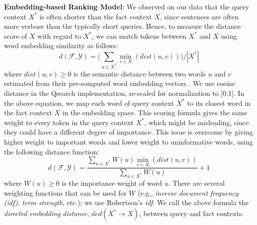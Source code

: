 \noindent \textbf{Embedding-based Ranking Model}: 
We observed on our data that the query context $X^*$ is often shorter than the fact context $X$, since sentences are often more verbose than the typically short queries. Hence, to measure the distance score of $X$ with regard to $X^*$, we can match tokens between $X^*$ and $X$ using word embedding similarity as follows:
\[d(\mathcal{F}, \mathcal{Y}) = {\bigg(\sum\limits_{u \in X^*} \min\limits_{v \in X}(dist(u,v))\bigg)}/{|X^*|}\]
where $dist(u,v) \geq 0$ is the semantic distance between two words $u$ and $v$ estimated from their pre-computed word embedding vectors \cite{DBLP:conf/emnlp/PenningtonSM14}. 
We use cosine distance in the Qsearch implementation, re-scaled for normalization to [0,1]. 
In the above equation, 
we map each word of query context $X^*$ to its closest word in the fact context $X$ in the embedding space. This scoring formula gives the same weight to every token in the query context $X^*$, which might be misleading, since they could have a different degree of importance.
This issue is overcome by giving higher weight to important words and lower weight
to uninformative words, using
the following distance function:
\[d(\mathcal{F}, \mathcal{Y}) = \frac{\sum\limits_{u \in X^*} W(u)\min\limits_{v \in X}(dist(u,v))}{\sum\limits_{u \in X^*}W(u)} + 1\]
where $W(u) \geq 0$ is the importance weight of word $u$. 
There are several weighting functions that can be used for $W$ (e.g., \textit{inverse document frequency (idf)}, \textit{term strength}, etc.); we use Robertson’s \textit{idf}\cite{DBLP:journals/jd/Robertson04}. 
We call the above formula the 
\textit{directed embedding distance}, $ded(X^* \rightarrow X)$,
between query and fact contexts.

